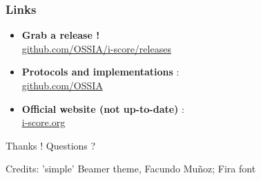 \documentclass{beamer}
\begin{document}
\begin{frame}
    \frametitle{Links}
    \begin{itemize}
        \setlength\itemsep{1em}
        \item \textbf{Grab a release !} ~\\ \url{github.com/OSSIA/i-score/releases}
        \item \textbf{Protocols and implementations} :~\\
        \url{github.com/OSSIA}
         \item \textbf{Official website (not up-to-date)} :~\\
         \url{i-score.org}
    \end{itemize}
        
    \centering
    \vspace{2em}
    \Large{Thanks ! Questions ?}
    \vspace{2em}
    
    \small{Credits: 'simple' Beamer theme, Facundo Muñoz; Fira font}
\end{frame}    
\end{document}
